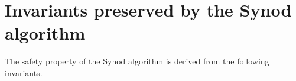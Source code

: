\documentclass[journal]{IEEEtran}
\begin{document}
%


\appendices
\section{Invariants preserved by the Synod algorithm}
\label{synod-safety}

The safety property of the Synod algorithm is derived from the following
invariants.
\end{document}
